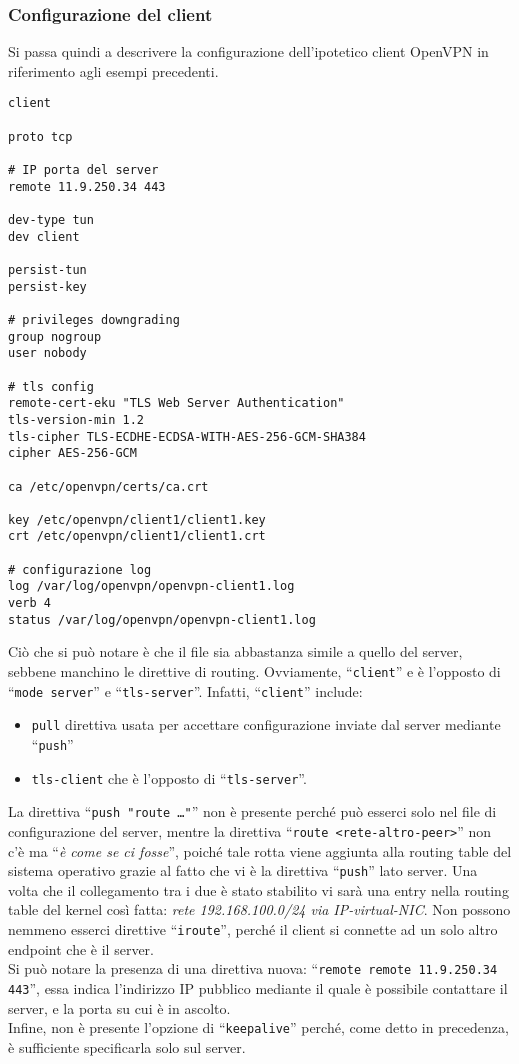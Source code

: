 \subsubsection{Configurazione del client}
Si passa quindi a descrivere la configurazione dell'ipotetico client OpenVPN in
riferimento agli esempi precedenti.
\begin{verbatim}
client
	
proto tcp
	
# IP porta del server
remote 11.9.250.34 443
	
dev-type tun
dev client
	
persist-tun
persist-key
	
# privileges downgrading
group nogroup
user nobody
	
# tls config
remote-cert-eku "TLS Web Server Authentication"
tls-version-min 1.2
tls-cipher TLS-ECDHE-ECDSA-WITH-AES-256-GCM-SHA384
cipher AES-256-GCM
	
ca /etc/openvpn/certs/ca.crt
	
key /etc/openvpn/client1/client1.key
crt /etc/openvpn/client1/client1.crt
	
# configurazione log
log /var/log/openvpn/openvpn-client1.log
verb 4
status /var/log/openvpn/openvpn-client1.log
\end{verbatim}
Ciò che si può notare è che il file sia abbastanza simile a quello del server,
sebbene manchino le direttive di routing. Ovviamente, ``\texttt{client}'' e
è l'opposto di ``\texttt{mode server}'' e
``\texttt{tls-server}''. Infatti, ``\texttt{client}'' include:
\begin{itemize}
	\item \texttt{pull} direttiva usata per accettare configurazione inviate dal
	      server mediante ``\texttt{push}''
	\item \texttt{tls-client} che è l'opposto di ``\texttt{tls-server}''.
\end{itemize}
La direttiva ``\texttt{push "route \ldots"}''
non è presente perché può esserci solo nel file di configurazione del server,
mentre la direttiva ``\texttt{route <rete-altro-peer>}'' non c'è ma ``\textit{è come
se ci fosse}'', poiché tale rotta viene aggiunta alla routing table del sistema
operativo grazie al fatto che vi è la direttiva ``\texttt{push}'' lato server.
Una volta che il collegamento tra i due è stato stabilito vi sarà una entry
nella routing table del kernel così fatta: \textit{rete 192.168.100.0/24 via
	IP-virtual-NIC}. Non possono nemmeno esserci direttive ``\texttt{iroute}'', perché
il client si connette ad un solo altro endpoint che è il server.\\
Si può notare la presenza di una direttiva nuova: ``\texttt{remote remote 11.9.250.34 443}'',
essa indica l'indirizzo IP pubblico mediante il quale è possibile contattare
il server, e la porta su cui è in ascolto.\\
Infine, non è presente l'opzione di ``\texttt{keepalive}'' perché, come detto in
precedenza, è sufficiente specificarla solo sul server.


